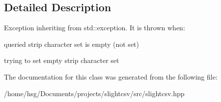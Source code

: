 \subsection{Detailed Description}
Exception inheriting from std\+::exception. It is thrown when\+:
\begin{DoxyItemize}
\item queried strip character set is empty (not set)
\item trying to set empty strip character set 
\end{DoxyItemize}

The documentation for this class was generated from the following file\+:\begin{DoxyCompactItemize}
\item 
/home/hsg/\+Documents/projects/slightcsv/src/slightcsv.\+hpp\end{DoxyCompactItemize}
